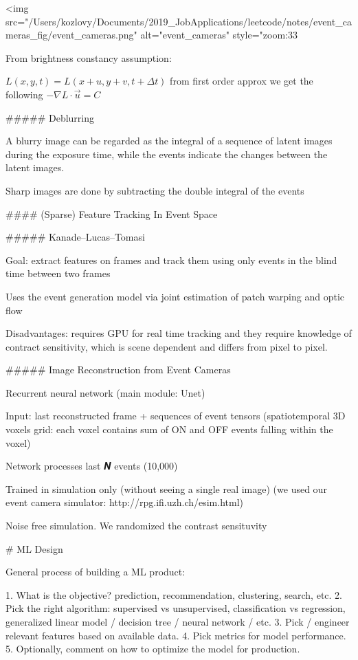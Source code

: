 <img src="/Users/kozlovy/Documents/2019_JobApplications/leetcode/notes/event_cameras_fig/event_cameras.png" alt="event_cameras" style="zoom:33%

From brightness constancy assumption:

$L(x,y,t) = L(x+u,y+v,t+\Delta t)$ from first order approx we get the following $-\nabla L \cdot \vec u = C$

##### Deblurring

A blurry image can be regarded as the integral of a sequence of latent images during the exposure time, while the events indicate the changes between the latent images.

Sharp images are done by subtracting the double integral of the events

#### (Sparse) Feature Tracking In Event Space

##### Kanade–Lucas–Tomasi

Goal: extract features on frames and track them using only events in the blind time between two frames

 Uses the event generation model via joint estimation of patch warping and optic flow

Disadvantages: requires GPU for real time tracking and they require knowledge of contract sensitivity, which is scene dependent and differs from pixel to pixel.	

##### Image Reconstruction from Event Cameras

Recurrent neural network (main module: Unet) 

Input: last reconstructed frame + sequences of event tensors (spatiotemporal 3D voxels grid: each voxel contains sum of ON and OFF events falling within the voxel)

Network processes last 𝑵 events (10,000) 

Trained in simulation only (without seeing a single real image) (we used our event camera simulator: http://rpg.ifi.uzh.ch/esim.html) 

Noise free simulation. We randomized the contrast sensituvity

# ML Design

General process of building a ML product:

1. What is the objective? prediction, recommendation, clustering, search, etc.
2. Pick the right algorithm: supervised vs unsupervised, classification vs regression, generalized linear model / decision tree / neural network / etc.
3. Pick / engineer relevant features based on available data.
4. Pick metrics for model performance.
5. Optionally, comment on how to optimize the model for production.

